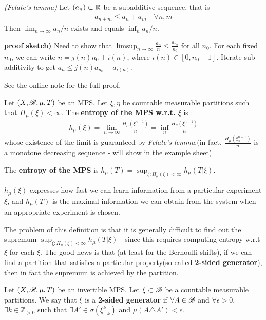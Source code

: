 \documentclass[12pt,a4paper]{report}
\newenvironment{proof}
{\begin{changemargin}{1cm}{0.5cm} 
	}%
	{\end{changemargin}
}
\begin{document}
\lem \emph{(Felate's lemma)} Let $(a_n)\subset \mathbb{R}$ be a subadditive sequence, that is
\begin{align*}
a_{n+m} \leq a_n + a_m \quad \forall n,m
\end{align*}
Then $\lim_{n\rightarrow \infty} a_n/n$ exists and equals $\inf_{n} a_n /n $.
\begin{proof}
\textbf{proof sketch)} Need to show that $\limsup_{n\rightarrow \infty} \frac{a_n}{n} \leq \frac{a_{n_0}}{n_0}$ for all $n_0$. For each fixed $n_0$, we can write $n = j(n)n_0 + i(n)$, where $i(n) \in [0,n_0-1]$. Iterate sub-additivity to get $a_n \leq j(n) a_{n_0} + a_{i(n)}$.

\quad See the online note for the full proof.
\end{proof}
\s

 Let $(X,\mathscr{B}, \mu, T)$ be an MPS. Let $\xi, \eta$ be countable measurable partitions such that $H_{\mu}(\xi) < \infty$. The \textbf{entropy of the MPS w.r.t. $\xi$} is :
\begin{align*}
h_{\mu} (\xi) = \lim_{n\rightarrow \infty} \frac{H_{\mu}(\xi_0^{n-1})}{n} = \inf_n \frac{H_{\mu}(\xi_0^{n-1})}{n}
\end{align*}
whose existence of the limit is guaranteed by \emph{Felate's lemma}.(in fact, $\frac{H_{\mu}(\xi_0^{n-1})}{n}$ is a monotone decreasing sequence - will show in the example sheet)

\quad The \textbf{entropy of the MPS} is $h_{\mu}(T) = \sup_{\xi : H_{\mu}(\xi)<\infty} h_{\mu}(T|\xi)$.
\s

$h_{\mu} (\xi)$ expresses how fast we can learn information from a particular experiment $\xi$, and $h_{\mu}(T)$ is the maximal information we can obtain from the system when an appropriate experiment is chosen.
\s

The problem of this definition is that it is generally difficult to find out the supremum $\sup_{\xi : H_{\mu}(\xi)<\infty} h_{\mu}(T|\xi)$ - since this requires computing entropy w.r.t $\xi$ for each $\xi$. The good news is that (at least for the Bernoulli shifts), if we can find a partition that satisfies a particular property(so called \textbf{2-sided generator}), then in fact the supremum is achieved by the partition.
\s

 Let $(X,\mathscr{B}, \mu, T)$ be an invertible MPS. Let $\xi \subset \mathscr{B}$ be a countable measurable partitions. We say that $\xi$ is a \textbf{2-sided generator} if $\forall A\in \mathscr{B}$ and $\forall \epsilon >0$, $\exists k\in \mathbb{Z}_{>0}$ such that $\exists A'\in \sigma( \xi^k_{-k} )$ and $\mu(A \triangle A') <\epsilon$.
\s
\end{document}

